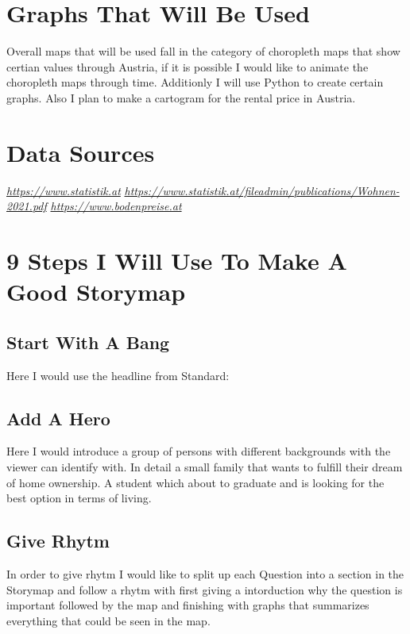 \documentclass{article}
\begin{document}

\section*{Graphs That Will Be Used}
\noindent Overall maps that will be used fall in the category of choropleth maps that show certian values through Austria, if it is possible I would like to animate the choropleth maps through time. Additionly I will use Python to create certain graphs. 
Also I plan to make a cartogram for the rental price in Austria.


\section*{Data Sources}

	\noindent \href{https://www.statistik.at}{\textit{https://www.statistik.at}}
	\newline
	\href{https://www.statistik.at/fileadmin/publications/Wohnen-2021.pdf}{\textit{https://www.statistik.at/fileadmin/publications/Wohnen-2021.pdf}}
	\newline
	\href{https://www.bodenpreise.at/}{\textit{https://www.bodenpreise.at}}


\section*{9 Steps I Will Use To Make A Good Storymap}

\subsection*{Start With A Bang}
\noindent Here I would use the headline from Standard: 

 \cite{Standard}


\subsection*{Add A Hero}
\noindent Here I would introduce a group of persons with different backgrounds with the viewer can identify with. In detail a small family that wants to fulfill their dream of home ownership. A student which about to graduate and is looking for the best option in terms of living.

\subsection*{Give Rhytm}
\noindent In order to give rhytm I would like to split up each Question into a section in the Storymap and follow a rhytm with first giving a intorduction why the question is important followed by the map and finishing with graphs that summarizes everything that could be seen in the map.
\end{document}
